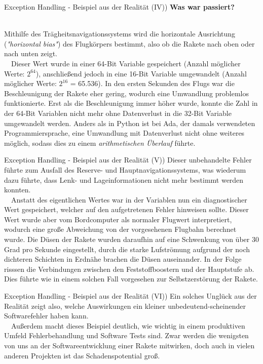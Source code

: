     \begin{frame}[fragile]{Exception Handling - Beispiel aus der Realität (IV))}
     \textbf{Was war passiert?} \\~\
     
     Mithilfe des Trägheitsnavigationssystems wird die horizontale Ausrichtung (\textit{"horizontal bias"}) des Flugkörpers bestimmt, also ob die Rakete nach oben oder nach unten zeigt. \\~\
     Dieser Wert wurde in einer 64-Bit Variable gespeichert (Anzahl möglicher Werte: $2^{64}$), anschließend jedoch in eine 16-Bit Variable umgewandelt (Anzahl möglicher Werte: $2^{16}$ = 65.536). In den ersten Sekunden des Flugs war die Beschleunigung der Rakete eher gering, wodurch eine Umwandlung problemlos funktionierte. Erst als die Beschleunigung immer höher wurde, konnte die Zahl in der 64-Bit Variablen nicht mehr ohne Datenverlust in die 32-Bit Variable umgewandelt werden. Anders als in Python ist bei Ada, der damals verwendeten Programmiersprache, eine Umwandlung mit Datenverlust nicht ohne weiteres möglich, sodass dies zu einem \textit{arithmetischen Überlauf} führte.
    \end{frame}
    
    \begin{frame}[fragile]{Exception Handling - Beispiel aus der Realität (V))}
     Dieser unbehandelte Fehler führte zum Ausfall des Reserve- und Hauptnavigationssystems, was wiederum dazu führte, dass Lenk- und Lageinformationen nicht mehr bestimmt werden konnten.\\~\
     Anstatt des eigentlichen Wertes war in der Variablen nun ein diagnostischer Wert gespeichert, welcher auf den aufgetretenen Fehler hinweisen sollte. Dieser Wert wurde aber vom Bordcomputer als normaler Flugwert interpretiert, wodurch eine große Abweichung von der vorgesehenen Flugbahn berechnet wurde. Die Düsen der Rakete wurden daraufhin auf eine Schwenkung von über 30 Grad pro Sekunde eingestellt, durch die starke Lufströmung aufgrund der noch dichteren Schichten in Erdnähe brachen die Düsen auseinander. In der Folge risssen die Verbindungen zwischen den Feststoffboostern und der Hauptstufe ab. Dies führte wie in einem solchen Fall vorgesehen zur Selbstzerstörung der Rakete.
    \end{frame}
    
    \begin{frame}[fragile]{Exception Handling - Beispiel aus der Realität (VI))}
     Ein solches Unglück aus der Realität zeigt also, welche Auswirkungen ein kleiner unbedeutend-scheinender Softwarefehler haben kann. \\~\
     Außerdem macht dieses Beispiel deutlich, wie wichtig in einem produktiven Umfeld Fehlerbehandlung und Software Tests sind. Zwar werden die wenigsten von uns an der Softwareentwicklung einer Rakete mitwirken, doch auch in vielen anderen Projekten ist das Schadenspotential groß.
    \end{frame}